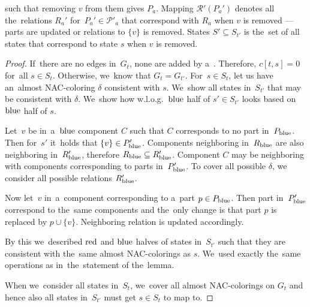 such that removing \( v \) from them gives \( P_a \).
Mapping \( \mathcal{R'}(P_a') \) denotes all the~relations \( R_a' \)
for~\( P_a' \in \mathcal{P'}_a \) that correspond with \( R_a \) when \( v \) is removed
--- parts are updated or relations to \( \{v\} \) is removed.
States \( S' \subseteq S_{t'} \) is the~set of all states that
correspond to state \( s \) when \( v \) is removed.
%
\begin{proof}
	If~there are no edges in~\( G_t \), none are added by a~\ForgetVertexNode{}.
	Therefore, \( c[t, s] = 0 \) for~all \( s \in S_t \).
	Otherwise, we~know that \( G_t = G_{t'} \).
	For~\( s \in S_t \),
	let us have an~almost NAC-coloring \( \delta \) consistent with \( s \).
	We~show all states in~\( S_{t'} \) that may be consistent with \( \delta \).
	We~show how w.l.o.g.\ \( \text{blue} \) half of \( s' \in S_{t'} \) looks
	based on \( \text{blue} \) half of \( s \).

	Let~\( v \) be in~a~\( \text{blue} \) component \( C \) such that
	\( C \) corresponds to no part in~\( P_{\text{blue}} \).
	Then for~\( s' \) it~holds that \( \{v\} \in P_{\text{blue}}' \).
	Components neighboring in~\( R_{\text{blue}} \)
	are also neighboring in~\( R_{\text{blue}}' \), therefore \( R_{\text{blue}} \subseteq R_{\text{blue}}' \).
	Component \( C \) may be neighboring with
	components corresponding to parts in~\( P_{\text{blue}}' \).
	To cover all possible \( \delta \),
	we consider all possible relations \( R_{\text{blue}}' \).

	Now let~\( v \) in~a~component corresponding to a~part \( p \in P_{\text{blue}} \).
	Then part in~\( P_{\text{blue}}' \) correspond to the~same components and the~only
	change is that part \( p \) is replaced by \( p \cup \{v\} \).
	Neighboring relation is updated accordingly.

	By this we~described \( \text{red} \) and \( \text{blue} \) halves of states in~\( S_{t'} \)
	such that they are consistent with the~same almost NAC-colorings as \( s \).
	We~used exactly the~same operations as in~the~statement of the~lemma.

	When we~consider all states in~\( S_t \), we~cover all almost NAC-colorings on \( G_t \)
	and hence also all states in~\( S_{t'} \) must get \( s \in S_t \) to map to.


\end{proof}
